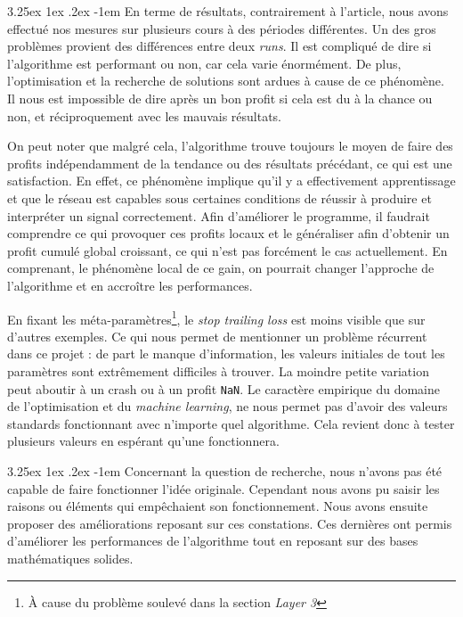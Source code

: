 \documentclass[a4paper, 11pt]{article}
\makeatletter
\renewcommand\paragraph{\@startsection{paragraph}{5}{\z@}%
  {3.25ex \@plus1ex \@minus.2ex}%
  {-1em}%
  {\normalfont\normalsize\bfseries}}
\makeatother
\begin{document}
\paragraph{}
En terme de résultats, contrairement à l'article, nous avons effectué nos mesures sur plusieurs cours à des périodes différentes. Un des gros problèmes
provient des différences entre deux \textit{runs}. Il est compliqué de dire si l'algorithme est performant ou non, car cela varie énormément. De plus,
l'optimisation et la recherche de solutions sont ardues à cause de ce phénomène. Il nous est impossible de dire après un bon profit si cela est du à la
chance ou non, et réciproquement avec les mauvais résultats.

On peut noter que malgré cela, l'algorithme trouve toujours le moyen de faire des profits indépendamment de la tendance ou des résultats précédant, ce
qui est une satisfaction. En effet, ce phénomène implique qu'il y a effectivement apprentissage et que le réseau est capables sous certaines conditions
de réussir à produire et interpréter un signal correctement. Afin
d'améliorer le programme, il faudrait comprendre ce qui provoquer ces profits locaux et le généraliser afin d'obtenir un profit cumulé global croissant, ce qui
n'est pas forcément le cas actuellement. En comprenant, le phénomène local de ce gain, on pourrait changer l'approche de l'algorithme et en accroître les
performances.

En fixant les méta-paramètres\footnote{À cause du problème soulevé dans la section \textit{Layer 3}}, le \textit{stop trailing loss} est moins visible
que sur d'autres exemples. Ce qui nous permet de mentionner un problème récurrent dans ce projet : de part le manque d'information, les valeurs initiales
de tout les paramètres sont extrêmement difficiles à trouver. La moindre petite variation peut aboutir à un crash ou à un profit \texttt{NaN}. Le caractère
empirique du domaine de l'optimisation et du \textit{machine learning}, ne nous permet pas d'avoir des valeurs standards fonctionnant avec n'importe quel
algorithme. Cela revient donc à tester plusieurs valeurs en espérant qu'une fonctionnera.

\paragraph{}
Concernant la question de recherche, nous n'avons pas été capable de faire fonctionner l'idée originale. Cependant nous avons pu saisir les raisons ou 
éléments qui empêchaient son fonctionnement. Nous avons ensuite proposer des améliorations reposant sur ces constations. Ces dernières ont permis 
d'améliorer les performances de l'algorithme tout en reposant sur des bases mathématiques solides.
\end{document}
